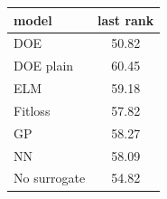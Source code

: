 \begin{tabular}{|lc|}
\hline
model & last rank\\
\hline
DOE & 50.82 \\
DOE plain & 60.45 \\
ELM & 59.18 \\
Fitloss & 57.82 \\
GP & 58.27 \\
NN & 58.09 \\
No surrogate & 54.82 \\
\hline
\end{tabular}
